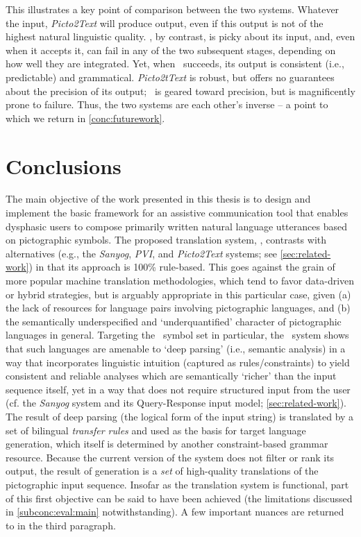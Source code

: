 This illustrates a key point of comparison between the two systems. Whatever
the input, \emph{Picto2Text} will produce output, even if this output is not of
the highest natural linguistic quality. \depicto, by contrast, is picky about
its input, and, even when it accepts it, can fail in any of the two subsequent
stages, depending on how well they are integrated. Yet, when \depicto\
succeeds, its output is consistent (i.e., predictable) and grammatical.
\emph{Picto2tText} is robust, but offers no guarantees about the precision of
its output; \depicto\ is geared toward precision, but is magnificently prone to
failure. Thus, the two systems are each other's inverse -- a point to which we
return in \cref{conc:futurework}.


\section{Conclusions}

The main objective of the work presented in this thesis is to design and
implement the basic framework for an assistive communication tool that enables
dysphasic users to compose primarily written natural language utterances based
on pictographic symbols. The proposed translation system, \depicto, contrasts
with alternatives (e.g., the \emph{Sanyog}, \emph{PVI}, and \emph{Picto2Text}
systems; see \cref{sec:related-work}) in that its approach is 100\% rule-based.
This goes against the grain of more popular machine translation methodologies,
which tend to favor data-driven or hybrid strategies, but is arguably
appropriate in this particular case, given (a) the lack of resources for
language pairs involving pictographic languages, and (b) the semantically
underspecified and `underquantified' character of pictographic languages in
general. Targeting the \sclera\ symbol set in particular, the \depicto\ system
shows that such languages are amenable to `deep parsing' (i.e., semantic
analysis) in a way that incorporates linguistic intuition (captured as
rules/constraints) to yield consistent and reliable analyses which are
semantically `richer' than the input sequence itself, yet in a way that does
not require structured input from the user (cf. the \emph{Sanyog} system and
its Query-Response input model; \cref{sec:related-work}). The result of deep
parsing (the logical form of the input string) is translated by a set of
bilingual \emph{transfer rules} and used as the basis for target language
generation, which itself is determined by another constraint-based grammar
resource. Because the current version of the system does not filter or rank its
output, the result of generation is a \emph{set} of high-quality translations
of the pictographic input sequence. Insofar as the translation system is
functional, part of this first objective can be said to have been achieved (the
limitations discussed in \cref{subconc:eval:main} notwithstanding). A few
important nuances are returned to in the third paragraph.

